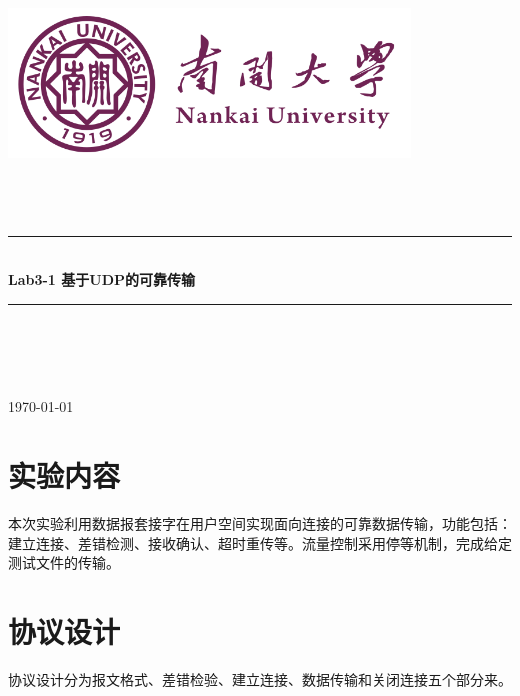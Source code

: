\documentclass[UTF8,a4paper,10pt]{ctexart}
\newcommand{\HRule}{\rule{\linewidth}{0.5mm}}%
\begin{document}
\begin{titlepage}
    \begin{center}
    \includegraphics[width=0.8\textwidth]{NKU.png}\\[1cm]    
    \textsc{\Huge {} }\\[0.9cm]
    \textsc{\huge {}}\\[0.9cm]
    \textsc{\huge {}}\\[0.8cm]
    \HRule \\[0.9cm]
    { \LARGE \bfseries Lab3-1 基于UDP的可靠传输}\\[0.4cm]
    \HRule \\[2.0cm]
    \centering
    \textsc{\LARGE {}}\\[0.5cm]
    \textsc{\LARGE {}}\\[0.5cm]
    \textsc{\LARGE {}}\\[0.5cm]
    \vfill
    {\Large \today}
    \end{center}
\end{titlepage}



\newpage
\tableofcontents
\setcounter{page}{1}

\vspace{1cm}

\section{实验内容}
本次实验利用数据报套接字在用户空间实现面向连接的可靠数据传输，功能包括：建立连接、差错检测、接收确认、超时重传等。流量控制采用停等机制，完成给定测试文件的传输。
\vspace{1cm}

\section{协议设计}
协议设计分为报文格式、差错检验、建立连接、数据传输和关闭连接五个部分来。
\end{document}
